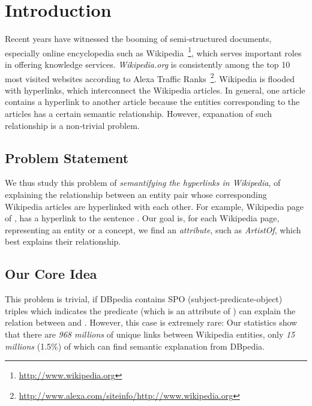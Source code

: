 \section{Introduction}

Recent years have witnessed the booming of semi-structured documents, especially online encyclopedia such as  Wikipedia~\footnote{\small\url{http://www.wikipedia.org}}, which serves important roles in offering knowledge services.
{\it Wikipedia.org} is consistently among the top 10 most visited websites according to Alexa Traffic Ranks~\footnote{\small\url{http://www.alexa.com/siteinfo/http://www.wikipedia.org}}.
Wikipedia is flooded with hyperlinks, which interconnect the Wikipedia articles.
In general, one article contains a hyperlink to another article because the entities corresponding to the articles has a certain semantic relationship.
However, expanation of such relationship is a non-trivial problem.

\subsection{Problem Statement}
We thus study this problem of
{\it semantifying the hyperlinks in Wikipedia}, of 
explaining the relationship between an entity pair whose corresponding Wikipedia articles are hyperlinked with each other.
For example, Wikipedia page of , has a hyperlink to  the sentence .
Our goal is, for each Wikipedia page, representing an entity or a concept,
we find an \emph{attribute}, such as \emph{ArtistOf}, which best explains their relationship.


\subsection{Our Core Idea}

This problem is trivial, if DBpedia contains 
SPO (subject-predicate-object) triples  which indicates the predicate  (which is an attribute of ) can explain the relation between  and . However, this case is extremely rare:
Our statistics show that there are \emph{968 millions} of unique links between Wikipedia entities, only \emph{15 millions} (1.5\%) of which can find semantic explanation from DBpedia.

